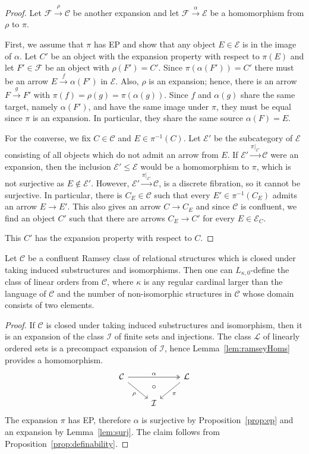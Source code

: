 \documentclass[preprint,12pt]{elsarticle}
\newcommand{\cat}[1]{\mathcal{#1}}
\begin{document}
\begin{proof}
Let $\cat F\xrightarrow{\rho}\cat C$ be another expansion and let $\cat F\xrightarrow{\alpha}\cat E$ be a homomorphism from $\rho$ to $\pi$. 

First, we assume that $\pi$ has EP and show that any object $E\in\cat E$ is in the image of $\alpha$. Let $C'$ be an object with the expansion property with respect to $\pi(E)$ and let $F'\in\cat F$ be an object with $\rho(F')=C'$. Since $\pi(\alpha(F'))=C'$ there must be an arrow $E\xrightarrow{f}\alpha(F')$ in $\cat E$. Also, $\rho$ is an expansion; hence, there is an arrow $F\xrightarrow{g}F'$ with $\pi(f)=\rho(g)=\pi(\alpha(g))$. Since $f$ and $\alpha(g)$ share the same target, namely $\alpha(F')$, and have the same image under $\pi$, they must be equal since $\pi$ is an expansion. In particular, they share the same source $\alpha(F)=E$.

For the converse, we fix $C\in\cat C$ and $E\in\cat \pi^{-1}(C)$. 
Let $\cat E'$ be the subcategory of $\cat E$ consisting of all objects which do not admit an arrow from $E$. 
If $\cat E'\xrightarrow{\pi|_{\cat E'}}\cat C$ were an expansion, then the inclusion $\cat E'\leq \cat E$ would be a homomorphism to $\pi$, which is not surjective as $E\notin\cat E'$.
However, $\cat E'\xrightarrow{\pi|_{\cat E'}}\cat C$, is a discrete fibration, so it cannot be surjective. In particular, there is $C_E\in\cat C$ such that every $E'\in\pi^{-1}(C_E)$ admits an arrow $E\to E'$. 
This also gives an arrow $C\to C_E$ and since $\cat C$ is confluent, we find an object $C'$ such that there are arrows $C_E\to C'$ for every $E\in\cat E_C$. 

This $C'$ has the expansion property with respect to $C$.
\end{proof}

\begin{cor}
\label{cor:order}
    Let $\cat C$ be a confluent Ramsey class of relational structures which is closed under taking induced substructures and isomorphisms. Then one can $L_{\kappa,0}$-define the class of linear orders from $\cat C$, where $\kappa$ is any regular cardinal larger than the language of $\cat C$ and the number of non-isomorphic structures in $\cat C$ whose domain consists of two elements. 
\end{cor}

\begin{proof}
    If $\cat C$ is closed under taking induced substructures and isomorphism, then it is an expansion of the class $\cat I$ of finite sets and injections. The class $\cat L$ of linearly ordered sets is a precompact expansion of $\cat I$, hence Lemma~\ref{lem:ramseyHoms} provides a homomorphism.
    $$
    \begin{tikzcd}
    \cat C \arrow[rd, "\rho"'] \arrow[rr, two heads,"\alpha", ""name=alpha] &        & \cat L \arrow[ld, "\pi"] \\
    & \cat I & 
    \arrow[to=2-2, from=alpha, pos=.5, phantom, "\circ"]
    \end{tikzcd}
    $$
    The expansion $\pi$ has EP, therefore $\alpha$ is surjective by Proposition~\ref{prop:ep} and an expansion by Lemma~\ref{lem:surj}. The claim follows from Proposition~\ref{prop:definability}.
\end{proof}
\end{document}
